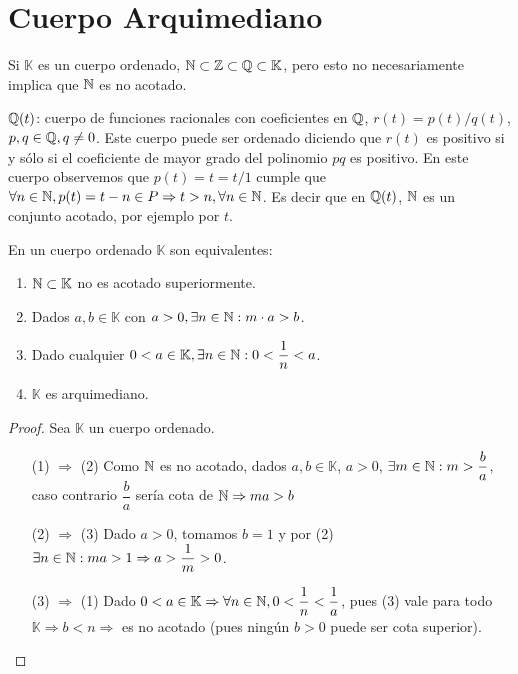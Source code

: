 \section{Cuerpo Arquimediano}

Si \(\mathbb{K} \) es un cuerpo ordenado, \(\mathbb{N} \subset \mathbb{Z} \subset \mathbb{Q} \subset \mathbb{K} \), pero esto no necesariamente implica que \(\mathbb{N} \) es no acotado.

\begin{eg}
    \(\mathbb{Q}(t)\): cuerpo de funciones racionales con coeficientes en \(\mathbb{Q} \), \(r(t) = p(t)/q(t)\), \(p, q \in \mathbb{Q}, q \neq 0\). Este cuerpo puede ser ordenado diciendo que \(r(t)\) es positivo si y sólo si el coeficiente de mayor grado del polinomio \(pq\) es positivo.
    En este cuerpo observemos que \(p(t)=t=t/1\) cumple que \(\forall n \in \mathbb{N}, p(t)=t-n \in P \Rightarrow t>n, \forall n \in \mathbb{N} \). Es decir que en \(\mathbb{Q}(t)\), \(\mathbb{N} \) es un conjunto acotado, por ejemplo por \(t\).
\end{eg}

\begin{theorem}
    En un cuerpo ordenado \(\mathbb{K} \) son equivalentes: \begin{enumerate}
        \item \(\mathbb{N} \subset \mathbb{K} \) no es acotado superiormente.
        \item Dados \(a, b \in \mathbb{K} \) con \(a>0, \exists n \in \mathbb{N}:m \cdot a>b\).
        \item Dado cualquier \(0<a \in \mathbb{K}, \exists n \in \mathbb{N} : 0 < \dfrac{1}{n} < a\).
        \item \(\mathbb{K} \) es arquimediano.
    \end{enumerate}
    \begin{proof}
        Sea \(\mathbb{K} \) un cuerpo ordenado.\begin{enumerate}
            \item[(1) \(\Rightarrow \) (2)] Como \(\mathbb{N} \) es no acotado, dados \(a,b \in \mathbb{K} \), \(a>0\), \(\exists m \in \mathbb{N} : m > \dfrac ba\), caso contrario \(\dfrac ba\) sería cota de \(\mathbb{N} \Rightarrow ma>b\)
            \item[(2) \(\Rightarrow \) (3)] Dado \(a>0\), tomamos \(b=1\) y por (2) \(\exists n \in \mathbb{N} : ma > 1 \Rightarrow a > \dfrac{1}{m} > 0\).
            \item[(3) \(\Rightarrow \) (1)] Dado \(0<a \in \mathbb{K} \Rightarrow \forall n \in \mathbb{N}, 0<\dfrac 1n<\dfrac 1a\), pues (3) vale para todo \(\mathbb{K} \Rightarrow b<n \Rightarrow \) es no acotado (pues ningún \(b>0\) puede ser cota superior).
        \end{enumerate}
    \end{proof}
\end{theorem}

